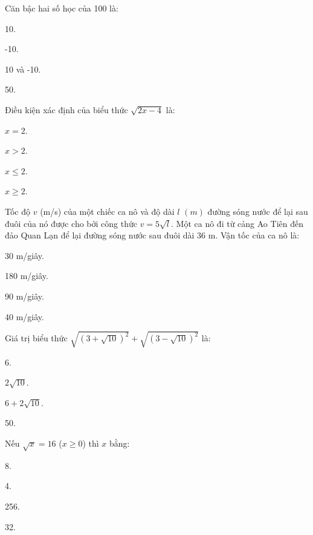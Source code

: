 \documentclass[%
    fontsize=12pt,%
    chapterprefix=false,%
    open=right,%
    twoside=false,%
    numbers=noenddot,%
    headings=optiontohead,%
    final,%
    DIV=15,%
    parskip=half %
]{scrbook}
\begin{document}
\begin{tracnghiem}

\item Căn bậc hai số học của 100 là:
\begin{options}
  \item 10.
  \item -10.
  \item 10 và -10.
  \item 50.
\end{options}

\item Điều kiện xác định của biểu thức $ \sqrt{2x - 4} $ là:
\begin{options}
  \item $ x = 2 $.
  \item $ x > 2 $.
  \item $ x \leq 2 $.
  \item $ x \geq 2 $.
\end{options}

\item Tốc độ $ v $ (m/s) của một chiếc ca nô và độ dài $ l $ $(m)$ đường sóng nước để lại sau đuôi của nó được cho bởi công thức $ v = 5\sqrt{l} $. Một ca nô đi từ cảng Ao Tiên đến đảo Quan Lạn để lại đường sóng nước sau đuôi dài 36 m. Vận tốc của ca nô là:
\begin{options}
  \item 30 m/giây.
  \item 180 m/giây.
  \item 90 m/giây.
  \item 40 m/giây.
\end{options}

\item Giá trị biểu thức $ \sqrt{(3 + \sqrt{10})^2} + \sqrt{(3 - \sqrt{10})^2} $ là:
\begin{options}
  \item 6.
  \item $ 2\sqrt{10} $.
  \item $ 6 + 2\sqrt{10} $.
  \item 50.
\end{options}

\item Nếu $ \sqrt{x} = 16 $ ($ x \geq 0 $) thì $ x $ bằng:
\begin{options}
  \item 8.
  \item 4.
  \item 256.
  \item 32.
\end{options}


\end{tracnghiem}
\end{document}
